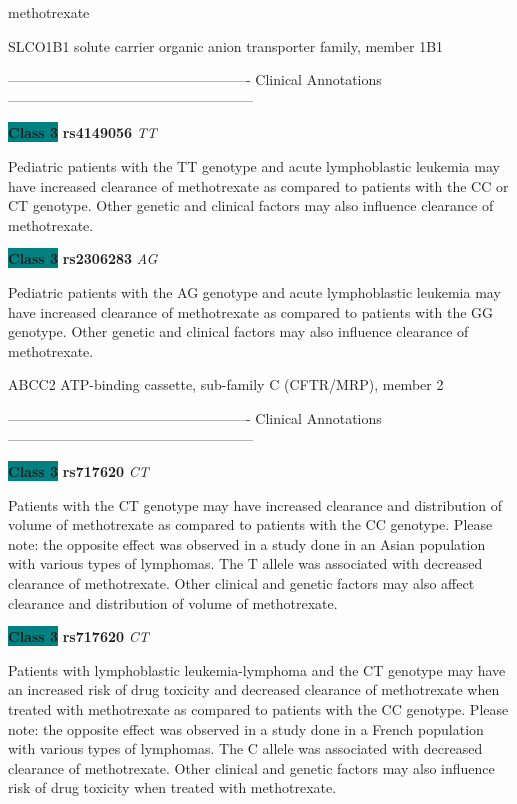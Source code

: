 \documentclass{resume} %
\begin{document}
\begin{rSection}{ methotrexate }
\begin{rSubsection}{ SLCO1B1 }{ solute carrier organic anion transporter family, member 1B1 }{}{}
\item[] ---------------------------------------------------- Clinical Annotations -----------------------------------------------------\newline
\item \textbf{\colorbox{teal} {Class 3}} \textbf{ rs4149056 } \textit{ TT }
\item[] Pediatric patients with the TT genotype and acute lymphoblastic leukemia may have increased clearance of methotrexate as compared to patients with the CC or CT genotype. Other genetic and clinical factors may also influence clearance of methotrexate.\item \textbf{\colorbox{teal} {Class 3}} \textbf{ rs2306283 } \textit{ AG }
\item[] Pediatric patients with the AG genotype and acute lymphoblastic leukemia may have increased clearance of methotrexate as compared to patients with the GG genotype. Other genetic and clinical factors may also influence clearance of methotrexate. 
\end{rSubsection}\begin{rSubsection}{ ABCC2 }{ ATP-binding cassette, sub-family C (CFTR/MRP), member 2 }{}{}
\item[]

\item[] ---------------------------------------------------- Clinical Annotations -----------------------------------------------------\newline
\item \textbf{\colorbox{teal} {Class 3}} \textbf{ rs717620 } \textit{ CT }
\item[] Patients with the CT genotype may have increased clearance and distribution of volume of methotrexate as compared to patients with the CC genotype. Please note: the opposite effect was observed in a study done in an Asian population with various types of lymphomas. The T allele was associated with decreased clearance of methotrexate. Other clinical and genetic factors may also affect clearance and distribution of volume of methotrexate. \item \textbf{\colorbox{teal} {Class 3}} \textbf{ rs717620 } \textit{ CT }
\item[] Patients with lymphoblastic leukemia-lymphoma and the CT genotype may have an increased risk of drug toxicity and decreased clearance of methotrexate when treated with methotrexate as compared to patients with the CC genotype. Please note: the opposite effect was observed in a study done in a French population with various types of lymphomas. The C allele was associated with decreased clearance of methotrexate. Other clinical and genetic factors may also influence risk of drug toxicity when treated with methotrexate. 
\end{rSubsection}


\end{rSection}
\end{document}
